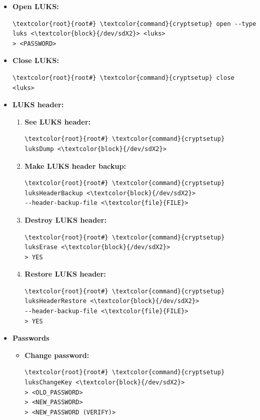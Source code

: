 \documentclass[10pt, a4paper, onecolumn, oneside, titlepage, openany]{book}
\begin{document}
\begin{itemize}
    \item \textbf{Open LUKS:}
\begin{Verbatim}[commandchars=\\\{\}]
\textcolor{root}{root#} \textcolor{command}{cryptsetup} open --type luks <\textcolor{block}{/dev/sdX2}> <luks>
> <PASSWORD>
\end{Verbatim}
    \item \textbf{Close LUKS:}
\begin{Verbatim}[commandchars=\\\{\}]
\textcolor{root}{root#} \textcolor{command}{cryptsetup} close <luks>
\end{Verbatim}
    \item \textbf{LUKS header:}
    \begin{enumerate}
        \item \textbf{See LUKS header:}
\begin{Verbatim}[commandchars=\\\{\}]
\textcolor{root}{root#} \textcolor{command}{cryptsetup} luksDump <\textcolor{block}{/dev/sdX2}>
\end{Verbatim}
        \item \textbf{Make LUKS header backup:}
\begin{Verbatim}[commandchars=\\\{\}]
\textcolor{root}{root#} \textcolor{command}{cryptsetup} luksHeaderBackup <\textcolor{block}{/dev/sdX2}>
--header-backup-file <\textcolor{file}{FILE}>
\end{Verbatim}
        \item \textbf{Destroy LUKS header:}
\begin{Verbatim}[commandchars=\\\{\}]
\textcolor{root}{root#} \textcolor{command}{cryptsetup} luksErase <\textcolor{block}{/dev/sdX2}>
> YES
\end{Verbatim}
        \item \textbf{Restore LUKS header:}
\begin{Verbatim}[commandchars=\\\{\}]
\textcolor{root}{root#} \textcolor{command}{cryptsetup} luksHeaderRestore <\textcolor{block}{/dev/sdX2}>
--header-backup-file <\textcolor{file}{FILE}>
> YES
\end{Verbatim}
    \end{enumerate}
    \item \textbf{Passwords}
    \begin{itemize}
        \item \textbf{Change password:}
\begin{Verbatim}[commandchars=\\\{\}]
\textcolor{root}{root#} \textcolor{command}{cryptsetup} luksChangeKey <\textcolor{block}{/dev/sdX2}>
> <OLD_PASSWORD>
> <NEW_PASSWORD>
> <NEW_PASSWORD (VERIFY)>
\end{Verbatim}
    \end{itemize}
\end{itemize}
\end{document}
